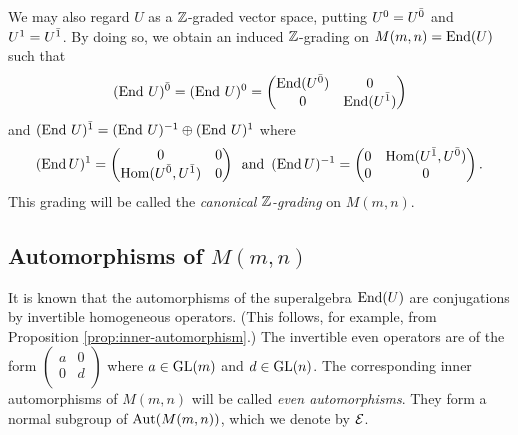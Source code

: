 We may also regard $U$ as a $\mathbb{Z}$-graded vector space, putting $U^0=U^{\bar0}$ and $U^1=U^{\bar1}$. By doing so, we obtain an induced $\mathbb{Z}$-grading on $M(m,n) = \operatorname{End} (U)$ such that
%
\[(\operatorname{End}\, U)^{\bar0} =(\operatorname{End}\, U)^0 =
	\left(\begin{matrix}
	\operatorname{End}(U^{\bar0})       &  0\\
	0                  &  \operatorname{End}(U^{\bar1})\\
	\end{matrix}
	\right)
\]
%
and $(\operatorname{End}\, U)^{\bar1} = (\operatorname{End}\, U)^{-1}\oplus (\operatorname{End}\, U)^1$ where
%
\[(\operatorname{End} U)^{1}=
	\left(\begin{matrix}
	0                  &  0\\
	\operatorname{Hom}(U^{\bar0},U^{\bar1}) &  0\\
	\end{matrix}
	\right) \,\text{ and }\, (\operatorname{End} U)^{-1}=
	\left(\begin{matrix}
	0                  &  \operatorname{Hom}(U^{\bar1},U^{\bar0})\\
	0				   &  0                 \\
	\end{matrix}
	\right).
\]
%
This grading will be called the \emph{canonical $\mathbb{Z}$-grading} on $M(m,n)$.%

\subsection{Automorphisms of $M(m,n)$}

It is known that the automorphisms of the superalgebra $\operatorname{End}(U)$ are conjugations by invertible homogeneous operators. 
(This follows, for example, from Proposition \ref{prop:inner-automorphism}.) The invertible even operators are of the form $\left( \begin{matrix}
a&0\\
0&d\\
\end{matrix}\right)$ where $a\in \operatorname{GL}(m)$ and $d\in \operatorname{GL}(n)$. The corresponding inner automorphisms of $M(m,n)$ will be called \emph{even automorphisms}. 
They form a normal subgroup of $\operatorname{Aut}(M(m,n))$, which we denote by $\mathcal E$.

